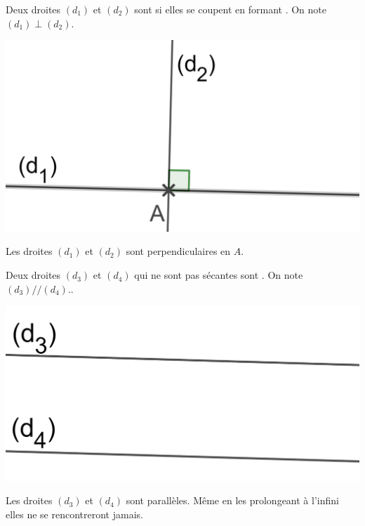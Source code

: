 \documentclass[xcolor={dvipsnames}]{beamer}
\begin{document}
\begin{frame}
	\begin{mydef}
		Deux droites $(d_1)$ et $(d_2)$ sont \pause {} si elles se coupent en formant . \pause On note $(d_1) \perp (d_2)$.\pause
		
	\end{mydef}
	
	
	\begin{myex}
		
		\begin{center}
			\includegraphics[scale=0.2]{perp} \pause
		\end{center}
		
		Les droites $(d_1)$ et $(d_2)$ sont perpendiculaires en $A$. 
		
		
	\end{myex}
\end{frame}

\begin{frame}
	\begin{mydef}
		Deux droites $(d_3)$ et $(d_4)$ \pause  qui ne sont pas sécantes sont . \pause On note $(d_3) // (d_4)$..\pause
		
	\end{mydef}
	
	
	\begin{myex}
		
		\begin{center}
			\includegraphics[scale=0.2]{para1}\pause
		\end{center}
		
		Les droites $(d_3)$ et $(d_4)$ sont parallèles. \pause Même en les prolongeant à l'infini elles ne se rencontreront jamais.
		
		
	\end{myex}
\end{frame}
\end{document}
